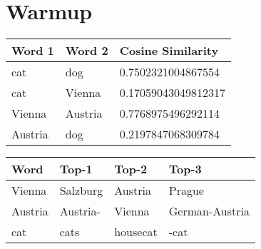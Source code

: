 \section{Warmup}

\begin{table}[hb]
\center
\begin{tabular}{|l|l|l|}
\hline
\textbf{Word 1} & \textbf{Word 2} & \textbf{Cosine Similarity} \\ \hline
cat             & dog             & 0.7502321004867554         \\ \hline
cat             & Vienna          & 0.17059043049812317        \\ \hline
Vienna          & Austria         & 0.7768975496292114         \\ \hline
Austria         & dog             & 0.2197847068309784         \\ \hline
\end{tabular}
\end{table}

\begin{table}[hb]
\center
\begin{tabular}{|l|l|l|l|}
\hline
\textbf{Word} & \textbf{Top-1} & \textbf{Top-2} & \textbf{Top-3} \\ \hline
Vienna        & Salzburg       & Austria        & Prague         \\ \hline
Austria       & Austria-       & Vienna         & German-Austria \\ \hline
cat           & cats           & housecat       & -cat           \\ \hline
\end{tabular}
\end{table}

